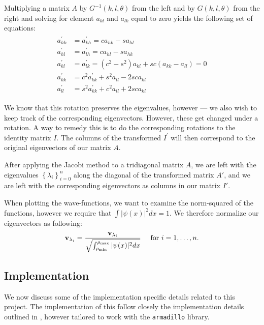 \documentclass[a4paper, 10pt]{amsart}
\newcommand{\mline}[1]{\texttt{#1}}
\renewcommand{\v}[1]{\mathbf{#1}}
\begin{document}
Multiplying a matrix $A$ by $G^{-1}(k, l, \theta)$ from the left and by $G(k,
l, \theta)$ from the right and solving for element $a_{kl}$ and $a_{lk}$ equal
to zero yields the following set of equations:
\begin{align}
  \label{eq:difference}
  \begin{split}
  a^{\prime}_{hk} &= a^{\prime}_{kh} = ca_{hk} - sa_{hl} \\
  a^{\prime}_{hl} &= a^{\prime}_{lh} = ca_{hl} - sa_{hk} \\
  a^{\prime}_{kl} &= a^{\prime}_{lk} = (c^2 - s^2)a_{kl} + sc(a_{kk} - a_{ll}) = 0\\
  a^{\prime}_{kk} &= c^2a^{\prime}_{kk} + s^2a_{ll} - 2sca_{kl}\\
  a^{\prime}_{ll} &= s^2a^{\prime}_{kk} + c^2a_{ll} + 2sca_{kl}
  \end{split}
\end{align}

We know that this rotation preserves the eigenvalues, however --- we also wish
to keep track of the corresponding eigenvectors. However, these get changed
under a rotation. A way to remedy this is to do the corresponding rotations to
the identity matrix $I$. The columns of the transformed $I^{\prime}$ will then
correspond to the original eigenvectors of our matrix $A$.

After applying the Jacobi method to a tridiagonal matrix $A$, we are left with
the eigenvalues $\left\{ \lambda_i \right\}_{i=0}^{n}$ along the diagonal of the
transformed matrix $A'$, and we are left with the corresponding eigenvectors as
columns in our matrix $I'$.

When plotting the wave-functions, we want to examine the norm-squared of the
functions, however we require that $\int |\psi(x)|^2 dx = 1$. We therefore
normalize our eigenvectors as following:
\begin{equation}
  \notag
  \v{v}_{\lambda_i} =
  \frac{\v{v}_{\lambda_i}}{\sqrt{\int_{\rho_{\textrm{min}}}^{\rho_{\textrm{max}}}
  |\psi(x)|^2 dx}} \quad \text{ for } i = 1, \ldots, n.
\end{equation}

\subsection{Implementation}
\label{sub:implementation}

We now discuss some of the implementation specific details related to this
project. The implementation of this follow closely the implementation details
outlined in \cite[pages~217--220]{t1}, however tailored to work with the
\mline{armadillo} library.
\end{document}
